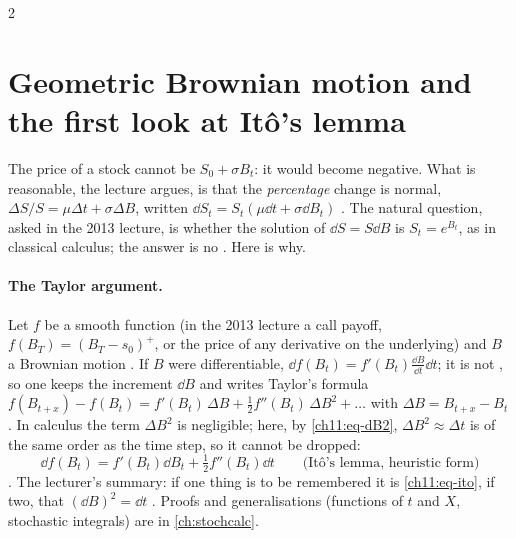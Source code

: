 \begin{paracol}{2}
\section{Geometric Brownian motion and the first look at It\^o's lemma}\label{ch11:sec-gbm}

The price of a stock cannot be $S_0+\sigma B_t$: it would become negative. What is reasonable, the lecture argues, is that the
\emph{percentage} change is normal, $\Delta S/S=\mu\Delta t+\sigma\Delta B$, written $\dd S_t=S_t(\mu\dd t+\sigma\dd B_t)$
. The natural question, asked in the 2013 lecture, is whether the solution of $\dd S=S\dd B$ is $S_t=e^{B_t}$, as in classical calculus; the answer is no
. Here is why.

\paragraph{The Taylor argument.} Let $f$ be a smooth function (in the 2013 lecture a call payoff, $f(B_T)=(B_T-s_0)^+$, or the price of any derivative on the underlying)
and $B$ a Brownian motion . If $B$ were differentiable, $\dd f(B_t)=f'(B_t)\frac{\dd B}{\dd t}\dd t$; it is not
, so one keeps the increment $\dd B$ and writes Taylor's formula
$f(B_{t+x})-f(B_t)=f'(B_t)\,\Delta B+\tfrac12f''(B_t)\,\Delta B^2+\dots$ with $\Delta B=B_{t+x}-B_t$
. In calculus the term $\Delta B^2$ is negligible; here, by
\eqref{ch11:eq-dB2}, $\Delta B^2\approx\Delta t$ is of the same order as the time step, so it cannot be dropped:
\begin{equation}\label{ch11:eq-ito}
  \dd f(B_t)=f'(B_t)\dd B_t+\tfrac12f''(B_t)\dd t\qquad\text{(It\^o's lemma, heuristic form)}
\end{equation}
. The lecturer's summary: if one thing is to be remembered it is \eqref{ch11:eq-ito}, if two, that $(\dd B)^2=\dd t$
. Proofs and generalisations (functions of $t$ and $X$, stochastic integrals) are in \cref{ch:stochcalc}.


\end{paracol}
